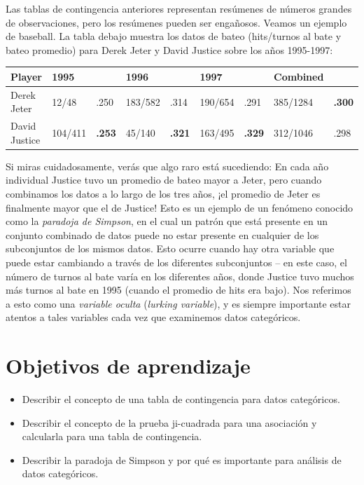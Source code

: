 \documentclass[
  12pt,
]{book}
\providecommand{\tightlist}{%
  \setlength{\itemsep}{0pt}\setlength{\parskip}{0pt}}
\begin{document}
Las tablas de contingencia anteriores representan resúmenes de números grandes de observaciones, pero los resúmenes pueden ser engañosos. Veamos un ejemplo de baseball. La tabla debajo muestra los datos de bateo (hits/turnos al bate y bateo promedio) para Derek Jeter y David Justice sobre los años 1995-1997:

\begin{longtable}[]{@{}lllllllll@{}}
\toprule
Player & 1995 & & 1996 & & 1997 & & Combined & \\
\midrule
\endhead
Derek Jeter & 12/48 & .250 & 183/582 & .314 & 190/654 & .291 & 385/1284 & \textbf{.300} \\
David Justice & 104/411 & \textbf{.253} & 45/140 & \textbf{.321} & 163/495 & \textbf{.329} & 312/1046 & .298 \\
\bottomrule
\end{longtable}

Si miras cuidadosamente, verás que algo raro está sucediendo: En cada año individual Justice tuvo un promedio de bateo mayor a Jeter, pero cuando combinamos los datos a lo largo de los tres años, ¡el promedio de Jeter es finalmente mayor que el de Justice! Esto es un ejemplo de un fenómeno conocido como la \emph{paradoja de Simpson}, en el cual un patrón que está presente en un conjunto combinado de datos puede no estar presente en cualquier de los subconjuntos de los mismos datos. Esto ocurre cuando hay otra variable que puede estar cambiando a través de los diferentes subconjuntos -- en este caso, el número de turnos al bate varía en los diferentes años, donde Justice tuvo muchos más turnos al bate en 1995 (cuando el promedio de hits era bajo). Nos referimos a esto como una \emph{variable oculta} (\emph{lurking variable}), y es siempre importante estar atentos a tales variables cada vez que examinemos datos categóricos.

\hypertarget{objetivos-de-aprendizaje-11}{%
\section{Objetivos de aprendizaje}\label{objetivos-de-aprendizaje-11}}

\begin{itemize}
\tightlist
\item
  Describir el concepto de una tabla de contingencia para datos categóricos.
\item
  Describir el concepto de la prueba ji-cuadrada para una asociación y calcularla para una tabla de contingencia.
\item
  Describir la paradoja de Simpson y por qué es importante para análisis de datos categóricos.
\end{itemize}
\end{document}
